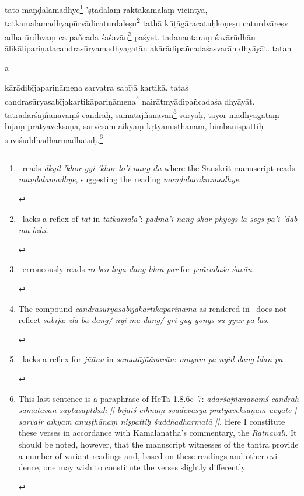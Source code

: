 \documentclass[naipra.tex]{subfiles}
\begin{document}
\begin{sanskrit}


\pstart
tato maṇḍalamadhye\footnote{
	\begin{english}%
		\TIB\ reads \emph{dkyil 'khor gyi 'khor lo'i nang du} where the Sanskrit manuscript reads \emph{maṇḍalamadhye}, suggesting the reading \emph{maṇḍalacakramadhye}.
	\end{english}
} 'ṣṭadalaṃ raktakamalaṃ vicintya, tatkamalamadhyapūrvādicaturdaleṣu\footnote{
	\begin{english}%
		\TIB\ lacks a reflex of \emph{tat} in \emph{tatkamala°}: \emph{padma'i nang shar phyogs la sogs pa'i 'dab ma bzhi}.
	\end{english}
} tathā kūṭāgāracatuḥkoṇeṣu caturdvāreṣv adha ūrdhvaṃ ca pañcada śaśavān\footnote{
	\begin{english}%
		\TIB\ erroneously reads \emph{ro bco lnga dang ldan par} for \emph{pañcadaśa śavān}.
	\end{english}
} paśyet. 
tadanantaraṃ śavārūḍhān ālikālipariṇatacandrasūryamadhyagatān akārādipañcadaśasvarān dhyāyāt.
tataḥ \begin{mantra}a\end{mantra}\dsh kārādibījapariṇāmena sarvatra sabījā kartikā.
tataś candrasūryasabījakartikāpariṇāmena\footnote{
	\begin{english}%
		The compound \emph{candrasūryasabījakartikāpariṇāma} as rendered in \TIB\ does not reflect \emph{sabīja}: \emph{zla ba dang/ nyi ma dang/ gri gug yongs su gyur pa las}.
	\end{english}
} nairātmyādipañcadaśa dhyāyāt. 
tatrādarśajñānavāṃś candraḥ, samatājñānavān\footnote{
	\begin{english}%
		\TIB\ lacks a reflex for \emph{jñāna} in \emph{samatājñānavān}: \emph{mnyam pa nyid dang ldan pa}. 
	\end{english}
} sūryaḥ, tayor madhyagataṃ bījaṃ pratyavekṣaṇā, sarveṣām aikyaṃ kṛtyānuṣṭhānam, bimbaniṣpattiḥ suviśuddhadharmadhātuḥ.\footnote{
	\begin{english}%
		This last sentence is a paraphrase of HeTa 1.8.6c–7: \emph{ādarśajñānavāṃś candraḥ samatāvān saptasaptikaḥ || bījaiś cihnaṃ svadevasya pratyavekṣaṇam ucyate | sarvair aikyam anuṣṭhānaṃ niṣpattiḥ śuddhadharmatā ||}.
		Here I constitute these verses in accordance with Kamalanātha's commentary, the \emph{Ratnāvalī}.
		It should be noted, however, that the manuscript witnesses of the tantra provide a number of variant readings and, based on these readings and other evidence, one may wish to constitute the verses slightly differently.
	\end{english}
}
\pend


\end{sanskrit}
\end{document}
